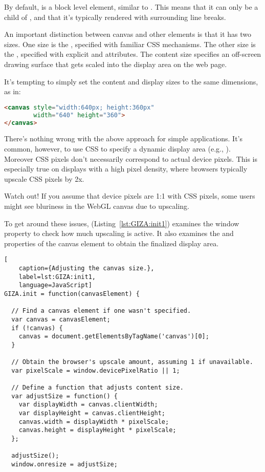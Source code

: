 By default,  is a block level element, similar to .  This means that it can only be a child of , and that it's typically rendered with surrounding line breaks.

An important distinction between canvas and other elements is that it has two  sizes.  One size is the , specified with familiar  CSS mechanisms.  The other size is the , specified with explicit   and   attributes.  The content size specifies an off-screen drawing surface that gets scaled into the display area on the web page.

It's tempting to simply set the content and display sizes to the same dimensions, as in:

\begin{lstlisting}[language=HTML]
<canvas style="width:640px; height:360px"
        width="640" height="360">
</canvas>
\end{lstlisting}

There's nothing wrong with the above approach for simple applications.  It's common, however, to use CSS to specify a dynamic display area (e.g., ).  Moreover CSS pixels don't necessarily correspond to actual device pixels.  This is especially true on displays with a high pixel density, where browsers typically upscale CSS pixels by 2x.

\begin{sidenote}%
Watch out!  If you assume that device pixels are 1:1 with CSS pixels, some users might see bluriness in the WebGL canvas due to upscaling.
\end{sidenote}

To get around these issues,  (Listing~\ref{lst:GIZA:init1}) examines the \linebreak {} window property to check how much upscaling is active.  It also examines the   and  properties of the canvas element to obtain the finalized display area.

\begin{lstlisting}[
    caption={Adjusting the canvas size.},
    label=lst:GIZA:init1,
    language=JavaScript]
GIZA.init = function(canvasElement) {

  // Find a canvas element if one wasn't specified.
  var canvas = canvasElement;
  if (!canvas) {
    canvas = document.getElementsByTagName('canvas')[0];
  }

  // Obtain the browser's upscale amount, assuming 1 if unavailable.
  var pixelScale = window.devicePixelRatio || 1;

  // Define a function that adjusts content size.
  var adjustSize = function() {
    var displayWidth = canvas.clientWidth;
    var displayHeight = canvas.clientHeight;
    canvas.width = displayWidth * pixelScale;
    canvas.height = displayHeight * pixelScale;
  };

  adjustSize();
  window.onresize = adjustSize;
\end{lstlisting} 

